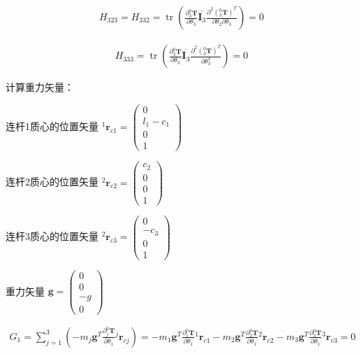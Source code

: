\documentclass{homework}
\begin{document}
\begin{sol}
\begin{align*}
  H_{323} = H_{332} = \operatorname{tr} (\frac{\partial {^0_3}\mathbf{T}}{\partial \theta_3} \overline{\mathbf{I}_3} \frac{\partial^2 ({^0_3}\mathbf{T})^T}{\partial \theta_2 \partial \theta_3}) 
                    = 0
\end{align*}

\begin{align*}
  H_{333} = \operatorname{tr} (\frac{\partial {^0_3}\mathbf{T}}{\partial \theta_3} \overline{\mathbf{I}_3} \frac{\partial^2 ({^0_3}\mathbf{T})^T}{\partial \theta_3^2}) 
          = 0
\end{align*}

计算重力矢量：

连杆1质心的位置矢量 $ {^1}\mathbf{r}_{c1} = \begin{pmatrix}
    0 \\
    l_1 - c_1 \\
    0 \\
    1
  \end{pmatrix} $ 

连杆2质心的位置矢量 $ {^2}\mathbf{r}_{c2} = \begin{pmatrix}
    c_2 \\
    0 \\
    0 \\
    1
  \end{pmatrix} $ 

连杆3质心的位置矢量 $ {^2}\mathbf{r}_{c3} = \begin{pmatrix}
    0 \\
    -c_3 \\
    0 \\
    1
  \end{pmatrix} $ 

重力矢量 $ \mathbf{g} = \begin{pmatrix}
    0 \\
    0 \\
    -g \\
    0
  \end{pmatrix} $

\begin{align*}
  G_1 = \sum_{j=1}^3 (-m_j \mathbf{g}^T \frac{\partial {^0_j}\mathbf{T}}{\partial \theta_1} {^j}\mathbf{r}_{cj}) 
      = -m_1 \mathbf{g}^T \frac{\partial {^0_1}\mathbf{T}}{\partial \theta_1} {^1}\mathbf{r}_{c1} - m_2 \mathbf{g}^T \frac{\partial {^0_2}\mathbf{T}}{\partial \theta_1} {^2}\mathbf{r}_{c2} - m_3 \mathbf{g}^T \frac{\partial {^0_3}\mathbf{T}}{\partial \theta_1} {^3}\mathbf{r}_{c3}
      = 0
\end{align*}


\end{sol}
\end{document}
